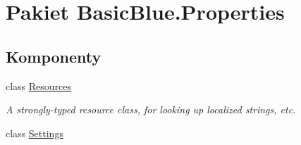 \hypertarget{namespace_basic_blue_1_1_properties}{\section{Pakiet Basic\-Blue.\-Properties}
\label{namespace_basic_blue_1_1_properties}
}
\subsection*{Komponenty}
\begin{DoxyCompactItemize}
\item 
class \hyperlink{class_basic_blue_1_1_properties_1_1_resources}{Resources}
\begin{DoxyCompactList}\small\item\em A strongly-\/typed resource class, for looking up localized strings, etc. \end{DoxyCompactList}\item 
class \hyperlink{class_basic_blue_1_1_properties_1_1_settings}{Settings}
\end{DoxyCompactItemize}
